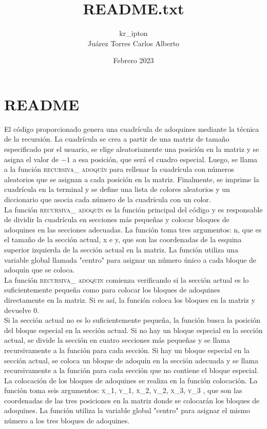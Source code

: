 \documentclass{article}
\title{README.txt}
\author{kr\_ipton\\
Juárez Torres Carlos Alberto}
\date{Febrero 2023}
\begin{document}
\maketitle

\section{README}
El código proporcionado genera una cuadrícula de adoquines mediante la técnica de la recursión.
La cuadrícula se crea a partir de una matriz de tamaño especificado por el usuario, se elige aleatoriamente una posición en la matriz y se asigna el valor de $-1$ a esa posición,
que será el cuadro especial. Luego, se llama a la función \textsc{recursiva\_ adoquín }
para rellenar la cuadrícula con números aleatorios que se asignan a cada posición en la matriz. Finalmente, se imprime la cuadrícula en la terminal y se define una lista de colores aleatorios y
un diccionario que asocia cada número de la cuadrícula con un color.\\

La función \textsc{recursiva\_ adoquín } es la función principal del código y es responsable de dividir la cuadrícula en secciones más pequeñas y
colocar bloques de adoquines en las secciones adecuadas. La función toma tres argumentos: n, que es el tamaño de la sección actual, x e y,
que son las coordenadas de la esquina superior izquierda de la sección actual en la matriz. La función utiliza una variable global llamada "centro"
para asignar un número único a cada bloque de adoquín que se coloca.\\

La función \textsc{recursiva\_ adoquin } comienza verificando si la sección actual es lo suficientemente pequeña como para colocar los bloques de adoquines directamente en la matriz.
Si es así, la función coloca los bloques en la matriz y devuelve 0.\\

Si la sección actual no es lo suficientemente pequeña, la función busca la posición del bloque especial en la sección actual.
Si no hay un bloque especial en la sección actual, se divide la sección en cuatro secciones más pequeñas y se llama recursivamente a la función para cada sección.
Si hay un bloque especial en la sección actual, se coloca un bloque de adoquín en la sección adecuada y se llama recursivamente a la función para cada sección que no contiene el bloque especial.\\

La colocación de los bloques de adoquines se realiza en la función colocación. La función toma seis argumentos: \textsc{x\_1, y\_1, x\_2, y\_2, x\_3, y\_3 },
que son las coordenadas de las tres posiciones en la matriz donde se colocarán los bloques de adoquines. La función utiliza la variable global "centro"
para asignar el mismo número a los tres bloques de adoquines.\\
\end{document}
